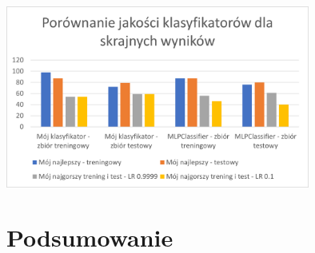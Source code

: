 \documentclass[12pt]{article}
\begin{document}
       \begin{center}
            \includegraphics[width=0.75\textwidth]{porownanie.png}
        \end{center}
\section{Podsumowanie}

\noindent
\end{document}
